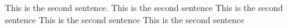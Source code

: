 This is the	      second sentence. This is the	      second sentence This is the	      second sentence This is the	      second sentence This is the	      second sentence
